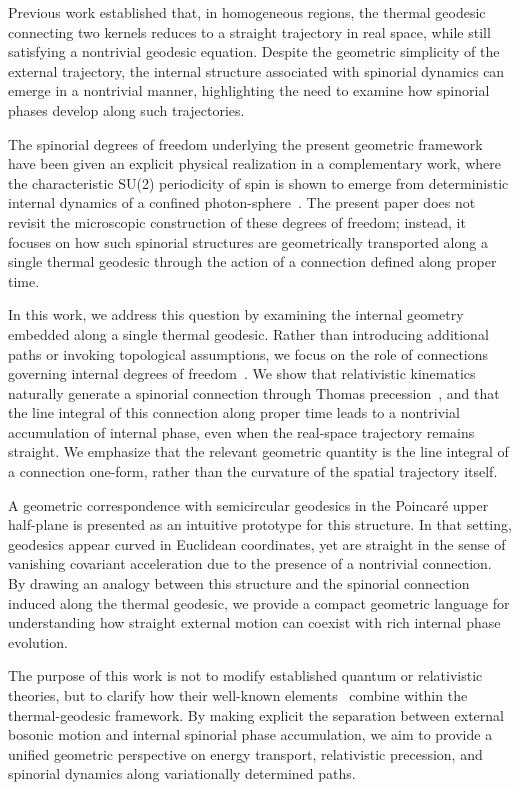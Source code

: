 \documentclass[%
 reprint,
 amsmath,amssymb,
 aps,
 prb,
]{revtex4-2}
\numberwithin{equation}{section}
\begin{document}
Previous work established that, in homogeneous regions, the thermal geodesic connecting two kernels reduces to a straight trajectory in real space, while still satisfying a nontrivial geodesic equation. Despite the geometric simplicity of the external trajectory, the internal structure associated with spinorial dynamics can emerge in a nontrivial manner, highlighting the need to examine how spinorial phases develop along such trajectories.

The spinorial degrees of freedom underlying the present geometric framework have been given an explicit physical realization in a complementary work, where the characteristic SU(2) periodicity of spin is shown to emerge from deterministic internal dynamics of a confined photon-sphere~\cite{hanamura17765238}. The present paper does not revisit the microscopic construction of these degrees of freedom; instead, it focuses on how such spinorial structures are geometrically transported along a single thermal geodesic through the action of a connection defined along proper time.

In this work, we address this question by examining the internal geometry embedded along a single thermal geodesic. Rather than introducing additional paths or invoking topological assumptions, we focus on the role of connections governing internal degrees of freedom~\cite{nakahara2003,aharonov1959}. We show that relativistic kinematics naturally generate a spinorial connection through Thomas precession~\cite{thomas1926,Jackson1999}, and that the line integral of this connection along proper time leads to a nontrivial accumulation of internal phase, even when the real-space trajectory remains straight. We emphasize that the relevant geometric quantity is the line integral of a connection one-form, rather than the curvature of the spatial trajectory itself.

A geometric correspondence with semicircular geodesics in the Poincar\'e upper half-plane is presented as an intuitive prototype for this structure. In that setting, geodesics appear curved in Euclidean coordinates, yet are straight in the sense of vanishing covariant acceleration due to the presence of a nontrivial connection. By drawing an analogy between this structure and the spinorial connection induced along the thermal geodesic, we provide a compact geometric language for understanding how straight external motion can coexist with rich internal phase evolution.

The purpose of this work is not to modify established quantum or relativistic theories, but to clarify how their well-known elements~\cite{bjorken1964,weinberg1995,ballentine1998} combine within the thermal-geodesic framework. By making explicit the separation between external bosonic motion and internal spinorial phase accumulation, we aim to provide a unified geometric perspective on energy transport, relativistic precession, and spinorial dynamics along variationally determined paths.
\end{document}
